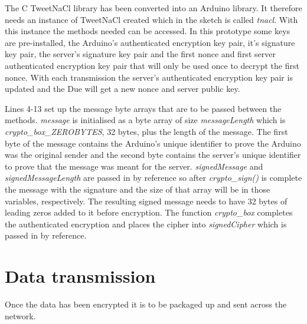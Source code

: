 The C TweetNaCl library has been converted into an Arduino library. It therefore needs an instance of TweetNaCl created which in the sketch is called \emph{tnacl}. With this instance the methods needed can be accessed. In this prototype some keys are pre-installed, the Arduino's authenticated encryption key pair, it's signature key pair, the server's signature key pair and the first nonce and first server authenticated encryption key pair that will only be used once to decrypt the first nonce. With each transmission the server's authenticated encryption key pair is updated and the Due will get a new nonce and server public key. 

Lines 4-13 set up the message byte arrays that are to be passed between the methods. \emph{message} is initialised as a byte array of size \emph{messageLength} which is \emph{crypto\_box\_ZEROBYTES}, 32 bytes, plus the length of the message. The first byte of the message contains the Arduino's unique identifier to prove the Arduino was the original sender and the second byte contains the server's unique identifier to prove that the message was meant for the server. \emph{signedMessage} and \emph{signedMessageLength} are passed in by reference so after \emph{crypto\_sign()} is complete the message with the signature and the size of that array will be in those variables, respectively. The resulting signed message needs to have 32 bytes of leading zeros added to it before encryption. The function \emph{crypto\_box} completes the authenticated encryption and places the cipher into \emph{signedCipher} which is passed in by reference. 

\clearpage

\section{Data transmission}
Once the data has been encrypted it is to be packaged up and sent across the network.

